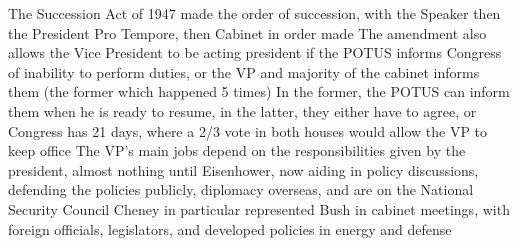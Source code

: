 \documentclass[11 pt, twoside]{article}
\newenvironment{outline*}
{
	\begin{outline}[enumerate]
	}
	{\end{outline}
}
\begin{document}
\begin{outline*}
\2 The Succession Act of 1947 made the order of succession, with the Speaker then the President Pro Tempore, then Cabinet in order made
\2 The amendment also allows the Vice President to be acting president if the POTUS informs Congress of inability to perform duties, or the VP and majority of the cabinet informs them (the former which happened 5 times)
\2 In the former, the POTUS can inform them when he is ready to resume, in the latter, they either have to agree, or Congress has 21 days, where a 2/3 vote in both houses would allow the VP to keep office
\1 The VP’s main jobs depend on the responsibilities given by the president, almost nothing until Eisenhower, now aiding in policy discussions, defending the policies publicly, diplomacy overseas, and are on the National Security Council
\2 Cheney in particular represented Bush in cabinet meetings, with foreign officials, legislators, and developed policies in energy and defense
\end{outline*}
\end{document}

